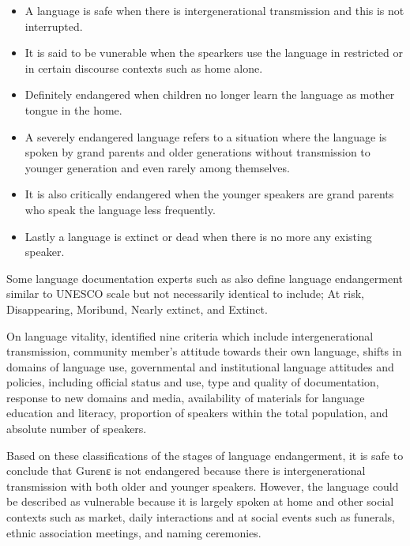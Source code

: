 \documentclass[output=paper,colorlinks,citecolor=brown]{langscibook}
\begin{document}
\begin{itemize}
\item A language is safe when there is intergenerational transmission and this is not interrupted.
\item 	It is said to be vunerable when the spearkers use the language in restricted or in certain discourse contexts such as home alone.
\item 	Definitely endangered when children no longer learn the language as mother tongue in the home.
\item 	A severely endangered language refers to a situation where the language is spoken by grand parents and older generations without transmission to younger generation and even rarely among themselves.
\item 	It is also critically endangered when the younger speakers are grand parents who speak the language less frequently.
\item 	Lastly a language is extinct or dead when there is no more any existing speaker. 
\end{itemize}
Some language documentation experts such as \citet{GrenobleWhaley1998} also define language endangerment similar to UNESCO scale but not necessarily identical to include; At risk, Disappearing, Moribund, Nearly extinct, and Extinct.


On language vitality, \citet[5]{UNESCO2011} identified nine criteria which include intergenerational transmission, community member’s attitude towards their own language, shifts in domains of language use, governmental and institutional language attitudes and policies, including official status and use, type and quality of documentation, response to new domains and media, availability of materials for language education and literacy, proportion of speakers within the total population, and absolute number of speakers.

Based on these classifications of the stages of language endangerment, it is safe to conclude that Gurenɛ is not endangered because there is intergenerational transmission with both older and younger speakers. However, the language could be described as vulnerable because it is largely spoken at home and other social contexts such as market, daily interactions and at social events such as funerals, ethnic association meetings, and naming ceremonies.
\end{document}
